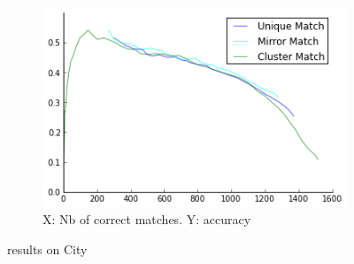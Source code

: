 \documentclass{article}
\begin{document}
\begin{figure}
{\begin{subfigure}[t]{0.35\textwidth}
			\label{fig:city2}
		\end{subfigure}%
		~ %
		\begin{subfigure}[t]{0.35\textwidth}
			\centering
			\includegraphics[width=\textwidth]{images/result_banksy_city}
			\caption{X: Nb of correct matches. Y: accuracy}
			\label{fig:result_city}
		\end{subfigure}%
	}%
	\label{fig:city}
	\caption{results on City}
\end{figure}
\end{document}
